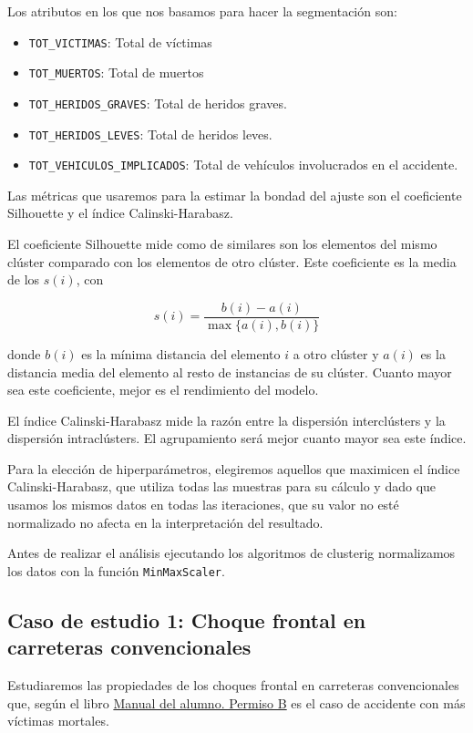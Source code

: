 \documentclass[a4]{article}
\begin{document}
Los atributos en los que nos basamos para hacer la segmentación son:

\begin{itemize}
\item \texttt{TOT\_VICTIMAS}: Total de víctimas
\item \texttt{TOT\_MUERTOS}: Total de muertos
\item \texttt{TOT\_HERIDOS\_GRAVES}: Total de heridos graves.
\item \texttt{TOT\_HERIDOS\_LEVES}: Total de heridos leves.
\item \texttt{TOT\_VEHICULOS\_IMPLICADOS}: Total de vehículos involucrados en el accidente.
\end{itemize}

Las métricas que usaremos para la estimar la bondad del ajuste son el coeficiente Silhouette y el índice Calinski-Harabasz.

El coeficiente Silhouette mide como de similares son los elementos del mismo clúster comparado con los elementos de otro clúster. Este coeficiente es la media de los $s(i)$, con

$$s(i) = \frac{b(i)-a(i)}{\max\{a(i), b(i)\}}$$

donde $b(i)$ es la mínima distancia del elemento $i$ a otro clúster y $a(i)$ es la distancia media del elemento al resto de instancias de su clúster. Cuanto mayor sea este coeficiente, mejor es el rendimiento del modelo.

El índice Calinski-Harabasz mide la razón entre la dispersión interclústers y la dispersión intraclústers. El agrupamiento será mejor cuanto mayor sea este índice.

Para la elección de hiperparámetros, elegiremos aquellos que maximicen el índice Calinski-Harabasz, que utiliza todas las muestras para su cálculo y dado que usamos los mismos datos en todas las iteraciones, que su valor no esté normalizado no afecta en la interpretación del resultado.

Antes de realizar el análisis ejecutando los algoritmos de clusterig normalizamos los datos con la función \texttt{MinMaxScaler}.

\newpage
\subsection{Caso de estudio 1: Choque frontal en carreteras convencionales}

Estudiaremos las propiedades de los choques frontal en carreteras convencionales que, según el libro \href{https://www.todostuslibros.com/libros/manual-del-alumno-permiso-b-facilauto_978-84-09-08551-4}{Manual del alumno. Permiso B} es el caso de accidente con más víctimas mortales.
\end{document}
